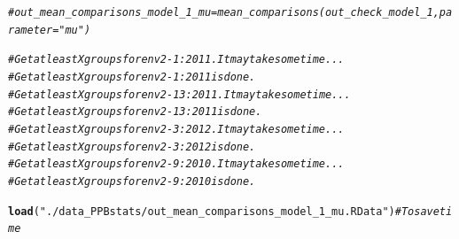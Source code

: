 \documentclass{book}\usepackage[]{graphicx}\usepackage[]{color}
\makeatletter
\newcommand{\hlstr}[1]{\textcolor[rgb]{0.192,0.494,0.8}{#1}}%
\newcommand{\hlcom}[1]{\textcolor[rgb]{0.678,0.584,0.686}{\textit{#1}}}%
\newcommand{\hlstd}[1]{\textcolor[rgb]{0.345,0.345,0.345}{#1}}%
\newcommand{\hlkwd}[1]{\textcolor[rgb]{0.737,0.353,0.396}{\textbf{#1}}}%
\newenvironment{kframe}{%
 \def\at@end@of@kframe{}%
 \ifinner\ifhmode%
  \def\at@end@of@kframe{\end{minipage}}%
  \begin{minipage}{\columnwidth}%
 \fi\fi%
 \def\FrameCommand##1{\hskip\@totalleftmargin \hskip-\fboxsep
 \colorbox{shadecolor}{##1}\hskip-\fboxsep
     \hskip-\linewidth \hskip-\@totalleftmargin \hskip\columnwidth}%
 \MakeFramed {\advance\hsize-\width
   \@totalleftmargin\z@ \linewidth\hsize
   \@setminipage}}%
 {\par\unskip\endMakeFramed%
 \at@end@of@kframe}
\newenvironment{knitrout}{}{} %
\makeatother
\begin{document}
\begin{knitrout}
\color{fgcolor}\begin{kframe}
\begin{alltt}
\hlcom{# out_mean_comparisons_model_1_mu = mean_comparisons(out_check_model_1, parameter = "mu")}

\hlcom{# Get at least X groups for env2-1:2011. It may take some time ...}
\hlcom{# Get at least X groups for env2-1:2011 is done.}
\hlcom{# Get at least X groups for env2-13:2011. It may take some time ...}
\hlcom{# Get at least X groups for env2-13:2011 is done.}
\hlcom{# Get at least X groups for env2-3:2012. It may take some time ...}
\hlcom{# Get at least X groups for env2-3:2012 is done.}
\hlcom{# Get at least X groups for env2-9:2010. It may take some time ...}
\hlcom{# Get at least X groups for env2-9:2010 is done.}

\hlkwd{load}\hlstd{(}\hlstr{"./data_PPBstats/out_mean_comparisons_model_1_mu.RData"}\hlstd{)} \hlcom{# To save time}
\end{alltt}


{\ttfamily\noindent\color{warningcolor}{\#\# Warning in readChar(con, 5L, useBytes = TRUE): impossible d'ouvrir le fichier compressé './data\_PPBstats/out\_mean\_comparisons\_model\_1\_mu.RData', cause probable : 'Aucun fichier ou dossier de ce type'}}

{\ttfamily\noindent\bfseries\color{errorcolor}{\#\# Error in readChar(con, 5L, useBytes = TRUE): impossible d'ouvrir la connexion}}\end{kframe}
\end{knitrout}
\end{document}
